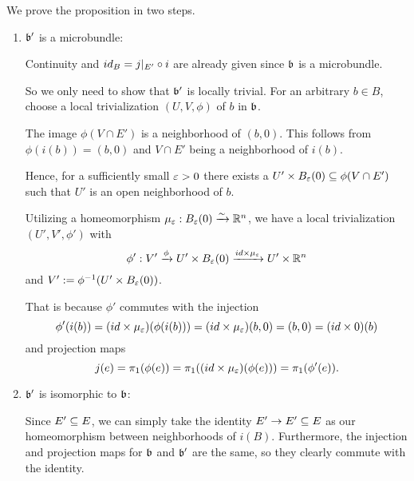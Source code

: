 \begin{myproof}
    We prove the proposition in two steps.
    \begin{enumerate}
        \item $\bb'$ is a microbundle:
        
        Continuity and $id_B = j\vert_{E'} \circ i$ are already given since $\bb$ is a microbundle.

        So we only need to show that $\bb'$ is locally trivial.
        For an arbitrary $b \in B$, choose a local trivialization $(U, V, \phi)$ of $b$ in $\bb$.
        
        The image $\phi(V \cap E')$ is a neighborhood of $(b, 0)$.
        This follows from $\phi(i(b)) = (b, 0)$ and $V \cap E'$ being a neighborhood of $i(b)$.

        Hence, for a sufficiently small $\varepsilon{} > 0$ there
        exists a $U' \cross \ball[\eps] \sub \phi(V \cap E')$ such that
        $U'$ is an open neighborhood of $b$.

        Utilizing a homeomorphism $\mu_\eps: \ball[\eps] \isomto \R^n$,
        we have a local trivialization $(U', V', \phi')$ with
        \[ \phi': V' \xto{\phi} U' \cross \ball[\eps] \xto{id \cross \mu_\eps} U' \cross \R^n \]
        and $V' := \inv{\phi}(U' \cross \ball[\eps])$.

        That is because $\phi'$ commutes with the injection
        \[ \phi'(i(b)) =  (id \times \mu_\varepsilon{})(\phi(i(b))) = (id \times \mu_\varepsilon{})(b, 0) = (b, 0) = (id \times 0)(b)\]
        and projection maps
        \[ j(e) = \pi_1(\phi(e)) = \pi_1((id \times \mu_\varepsilon{})(\phi(e))) = \pi_1(\phi'(e)). \]
        
        \item $\bb'$ is isomorphic to $\bb$:

        Since $E' \subseteq{} E$, we can simply take the identity $E' \to E' \subseteq{} E$
        as our homeomorphism between neighborhoods of $i(B)$.
        Furthermore, the injection and projection maps for $\bb$ and $\bb'$ are the same,
        so they clearly commute with the identity.
    \end{enumerate}
\end{myproof}